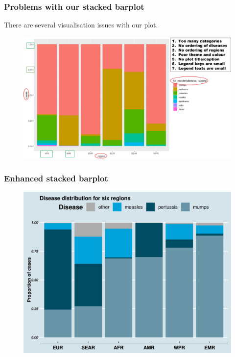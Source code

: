 \documentclass{beamer}
\begin{document}
\begin{frame}\frametitle{Problems with our stacked barplot}
There are several visualisation issues with our plot.
\begin{figure}
\includegraphics[width=0.99\linewidth]{PlotsLec1/BareboneStackedProblem}
\end{figure}
\end{frame}

\begin{frame}\frametitle{Enhanced stacked barplot}
\begin{figure}
\includegraphics[width=0.99\linewidth]{PlotsLec1/DiseaseStackedBar}
\end{figure}
\end{frame}
\end{document}
